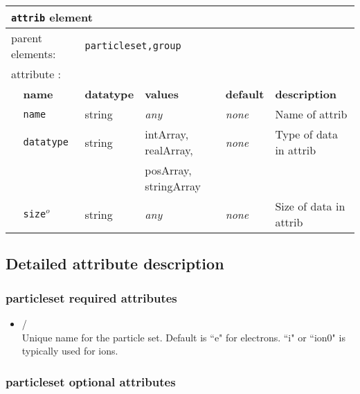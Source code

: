 \begin{table}[h]
\begin{center}
\begin{tabularx}{\textwidth}{l l l l l l }
\hline
\multicolumn{6}{l}{\texttt{attrib} element} \\
\hline
\multicolumn{2}{l}{parent elements:} & \multicolumn{4}{l}{\texttt{particleset,group}}\\
\multicolumn{2}{l}{attribute      :} & \multicolumn{4}{l}{}\\
   &   \bfseries name            & \bfseries datatype & \bfseries values & \bfseries default   & \bfseries description \\
   &   \texttt{name}             &  string            &  \textit{any}    &  \textit{none}    & Name of attrib              \\
   &   \texttt{datatype}         &  string            &  intArray, realArray, &  \textit{none} & Type of data in attrib \\
   &                             &                    &  posArray, stringArray &             &                        \\
   &   \texttt{size}$^o$         &  string            &  \textit{any}    &  \textit{none}    & Size of data in attrib \\
  \hline
  \hline
\end{tabularx}
\end{center}
\end{table}

\subsection{Detailed attribute description}

\subsubsection{particleset required attributes}

\begin{itemize}
\item {}/ \\
Unique name for the particle set. Default is ``e" for electrons. ``i" or ``ion0" is typically used for ions. 
\end{itemize}

\subsubsection{particleset optional attributes}

